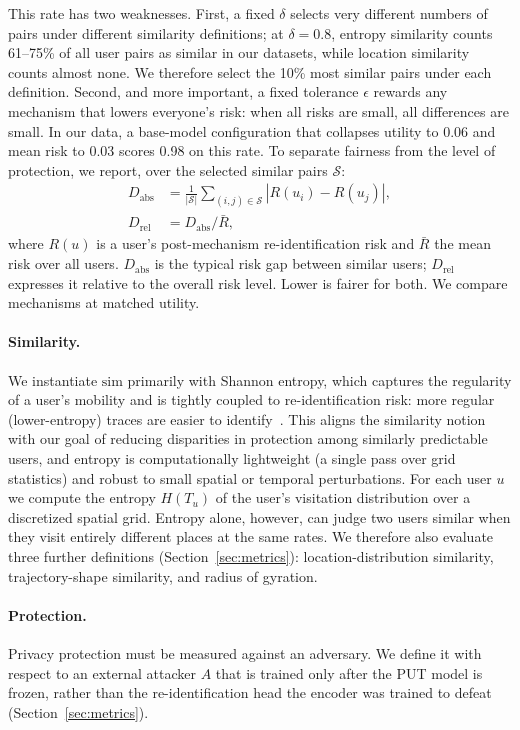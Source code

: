 \documentclass[sigconf,anonymous,review]{acmart}
\begin{document}
This rate has two weaknesses. First, a fixed $\delta$ selects very different numbers of pairs under different similarity definitions; at $\delta=0.8$, entropy similarity counts 61--75\% of all user pairs as similar in our datasets, while location similarity counts almost none. We therefore select the 10\% most similar pairs under each definition. Second, and more important, a fixed tolerance $\epsilon$ rewards any mechanism that lowers everyone's risk: when all risks are small, all differences are small. In our data, a base-model configuration that collapses utility to 0.06 and mean risk to 0.03 scores 0.98 on this rate. To separate fairness from the level of protection, we report, over the selected similar pairs $\mathcal{S}$:
\begin{align}
D_{\mathrm{abs}} &= \tfrac{1}{|\mathcal{S}|}\textstyle\sum_{(i,j)\in\mathcal{S}} |R(u_i)-R(u_j)|, \\
D_{\mathrm{rel}} &= D_{\mathrm{abs}} / \bar R ,
\end{align}
where $R(u)$ is a user's post-mechanism re-identification risk and $\bar R$ the mean risk over all users. $D_{\mathrm{abs}}$ is the typical risk gap between similar users; $D_{\mathrm{rel}}$ expresses it relative to the overall risk level. Lower is fairer for both. We compare mechanisms at matched utility.

\paragraph{Similarity.} We instantiate $\mathrm{sim}$ primarily with Shannon entropy, which captures the regularity of a user's mobility and is tightly coupled to re-identification risk: more regular (lower-entropy) traces are easier to identify~\cite{song2010limits}. This aligns the similarity notion with our goal of reducing disparities in protection among similarly predictable users, and entropy is computationally lightweight (a single pass over grid statistics) and robust to small spatial or temporal perturbations. For each user $u$ we compute the entropy $H(T_u)$ of the user's visitation distribution over a discretized spatial grid. Entropy alone, however, can judge two users similar when they visit entirely different places at the same rates. We therefore also evaluate three further definitions (Section~\ref{sec:metrics}): location-distribution similarity, trajectory-shape similarity, and radius of gyration.

\paragraph{Protection.} Privacy protection must be measured against an adversary. We define it with respect to an external attacker $A$ that is trained only after the PUT model is frozen, rather than the re-identification head the encoder was trained to defeat (Section~\ref{sec:metrics}).
\end{document}
